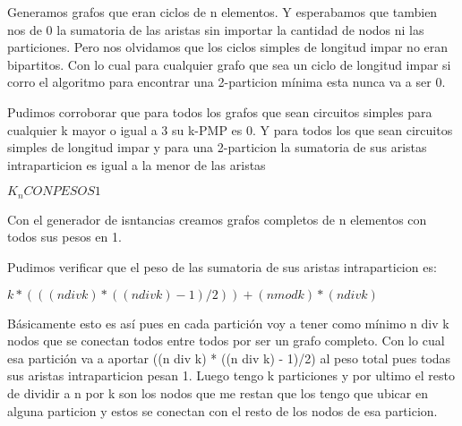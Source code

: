 Generamos grafos que eran ciclos de n elementos. Y esperabamos que tambien nos de 0 la sumatoria de las aristas sin importar la cantidad de nodos ni las particiones. Pero nos olvidamos que los ciclos simples de longitud impar no eran bipartitos. Con lo cual para cualquier grafo que sea un ciclo de longitud impar si corro el algoritmo para encontrar una 2-particion m\'inima esta nunca va a ser 0.

Pudimos corroborar que para todos los grafos que sean circuitos simples para cualquier k mayor o igual a 3 su k-PMP es 0. Y para todos los que sean circuitos simples de longitud impar y para una 2-particion la sumatoria de sus aristas intraparticion es igual a la menor de las aristas

$K_n CON PESOS 1$

Con el generador de isntancias creamos grafos completos de n elementos con todos sus pesos en 1.

Pudimos verificar que el peso de las sumatoria de sus aristas intraparticion es:

\bc
	$k * (((n  div  k) * ((n  div  k) - 1)/2)) + (n  mod  k) * (n  div  k)$
\ec

B\'asicamente esto es as\'i pues en cada partici\'on voy a tener como m\'inimo n div k nodos que se conectan todos entre todos por ser un grafo completo. Con lo cual esa partici\'on va a aportar ((n div k) * ((n div k) - 1)/2) al peso total pues todas sus aristas intraparticion pesan 1. Luego tengo k particiones y por ultimo el resto de dividir a n por k son los nodos que me restan que los tengo que ubicar en alguna particion y estos se conectan con el resto de los nodos de esa particion.